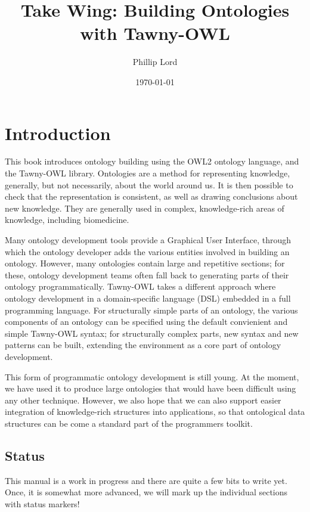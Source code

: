 \documentclass[11pt]{article}
\author{Phillip Lord}
\date{\today}
\title{Take Wing: Building Ontologies with Tawny-OWL}
\begin{document}
\maketitle
\tableofcontents


\section{Introduction}
\label{sec-1}

This book introduces ontology building using the OWL2 ontology language, and
the Tawny-OWL library. Ontologies are a method for representing knowledge,
generally, but not necessarily, about the world around us. It is then possible
to check that the representation is consistent, as well as drawing conclusions
about new knowledge. They are generally used in complex, knowledge-rich areas
of knowledge, including biomedicine.

Many ontology development tools provide a Graphical User Interface, through
which the ontology developer adds the various entities involved in building an
ontology. However, many ontologies contain large and repetitive sections; for
these, ontology development teams often fall back to generating parts of their
ontology programmatically. Tawny-OWL takes a different approach where ontology
development in a domain-specific language (DSL) embedded in a full programming
language. For structurally simple parts of an ontology, the various components
of an ontology can be specified using the default convienient and simple
Tawny-OWL syntax; for structurally complex parts, new syntax and new patterns
can be built, extending the environment as a core part of ontology
development.

This form of programmatic ontology development is still young. At the moment,
we have used it to produce large ontologies that would have been difficult
using any other technique. However, we also hope that we can also support
easier integration of knowledge-rich structures into applications, so that
ontological data structures can be come a standard part of the programmers
toolkit.


\subsection{Status}
\label{sec-1-1}

This manual is a work in progress and there are quite a few bits to write yet.
Once, it is somewhat more advanced, we will mark up the individual sections
with status markers!
\end{document}
